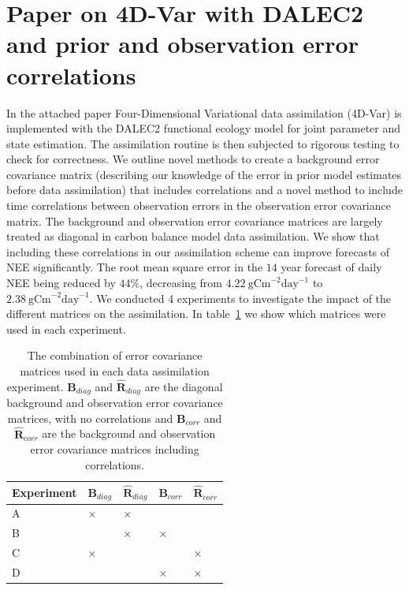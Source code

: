 \documentclass[11pt]{article}
\begin{document}
\section{Paper on 4D-Var with DALEC2 and prior and observation error correlations}

In the attached paper Four-Dimensional Variational data assimilation (4D-Var) is implemented with the DALEC2 functional ecology model for joint parameter and state estimation. The assimilation routine is then subjected to rigorous testing to check for correctness. We outline novel methods to create a background error covariance matrix (describing our knowledge of the error in prior model estimates before data assimilation) that includes correlations and a novel method to include time correlations between observation errors in the observation error covariance matrix. The background and observation error covariance matrices are largely treated as diagonal in carbon balance model data assimilation. We show that including these correlations in our assimilation scheme can improve forecasts of NEE significantly. The root mean square error in the $14$ year forecast of daily NEE being reduced by $44\%$, decreasing from $4.22~\text{gCm}^{-2}\text{day}^{-1}$ to $2.38~\text{gCm}^{-2}\text{day}^{-1}$. We conducted 4 experiments to investigate the impact of the different matrices on the assimilation. In table~\ref{table:exps_tab} we show which matrices were used in each experiment. 

\begin{table}[ht] 
\begin{center}
	\begin{tabular}{| l | l | l | l | l |}
	\hline
	Experiment & $\textbf{B}_{diag}$ & $\hat{\mathbf{R}}_{diag}$ & $\textbf{B}_{corr}$ &
	$\hat{\mathbf{R}}_{corr}$ \\ \hline
	A & $\times$ & $\times$ & & \\ \hline
	B & & $\times$ & $\times$ & \\ \hline
	C & $\times$ & & & $\times$ \\ \hline
	D & & & $\times$ & $\times$ \\ 
	\hline
	\end{tabular}
	\caption{The combination of error covariance matrices used in each data assimilation experiment. $\textbf{B}_{diag}$ and $\hat{\mathbf{R}}_{diag}$ are the diagonal background and observation error covariance matrices, with no correlations and $\textbf{B}_{corr}$ and $\hat{\mathbf{R}}_{corr}$ are the background and observation error covariance matrices including correlations.}
	\label{table:exps_tab}
\end{center} 
\end{table}
\end{document}
